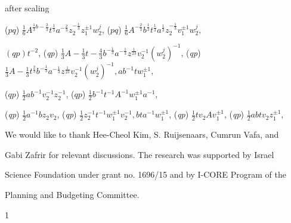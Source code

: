 \documentclass[a4paper,12pt]{article}
\begin{document}
after scaling
\begin{center}
($pq$) $\displaystyle \frac{1}{6}A^{\frac{1}{3}b-\frac{2}{3}}t^{\frac{1}{3}}a^{-\frac{2}{3}}z_{2}^{-\frac{1}{3}}z_{1}^{\pm 1}w_{2}^{j}$, ($pq$) $\displaystyle \frac{1}{6}A^{-\frac{2}{3}}b^{\frac{1}{3}}t^{\frac{1}{3}}a^{\frac{1}{3}}z_{2}^{-\frac{1}{3}}v_{1}^{\pm 1}w_{2}^{j},$
\end{center}
$(qp)t^{-2}$, ({\it qp}) $\displaystyle \frac{1}{3}A-\frac{1}{3}t-\frac{4}{3}b^{-\frac{1}{3}}a^{-\frac{1}{3}}z^{\frac{1}{23}}v_{2}^{-1}(w_{2}^{j})^{-1}$, ({\it qp}) $\displaystyle \frac{1}{3}A-\frac{1}{3}t^{\frac{2}{3}}b^{-\frac{1}{3}}a^{-\frac{1}{3}}z^{\frac{1}{23}}v_{2}^{-1}(w_{2}^{j})^{-1}, ab^{-1}tw_{1}^{\pm 1},$
\begin{center}
($qp$) $\displaystyle \frac{1}{2}ab^{-1}v_{2}^{-1}z_{2}^{-1}$, ($qp$) $\displaystyle \frac{1}{2}b^{-1}t^{-1}A^{-1}w_{1}^{\pm 1}a^{-1},$
\end{center}
({\it qp}) $\displaystyle \frac{1}{2}a^{-1}bz_{2}v_{2}$, ({\it qp}) $\displaystyle \frac{1}{2}z_{2}^{-1}t^{-1}w_{1}^{\pm 1}v_{2}^{-1}, bta^{-1}w_{1}^{\pm 1}$, ({\it qp}) $\displaystyle \frac{1}{2}tv_{2}Av_{1}^{\pm 1}$, ({\it qp}) $\displaystyle \frac{1}{2}abtv_{2}z_{1}^{\pm 1},$

We would like to thank Hee-Cheol Kim, S. Ruijsenaars, Cumrun Vafa, and

Gabi Zafrir for relevant discussions. The research was supported by Israel

Science Foundation under grant no. 1696/15 and by $\mathrm{I}$-CORE Program of the

Planning and Budgeting Committee.

1
\end{document}

